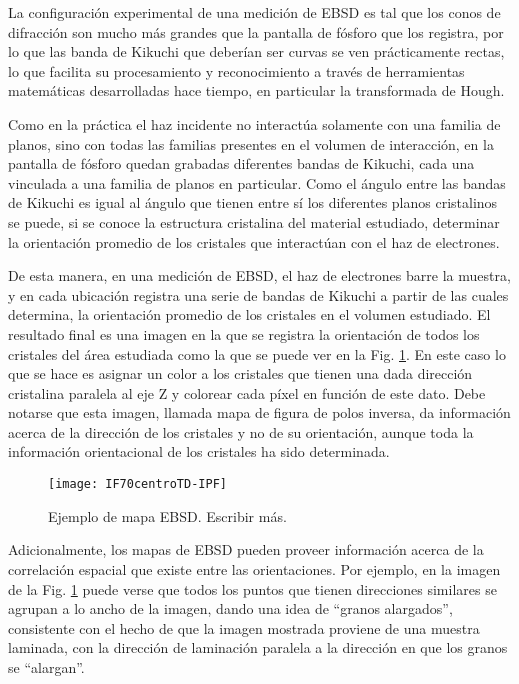 La configuración experimental de una medición de EBSD es tal que los conos de difracción son mucho más grandes que la pantalla de fósforo que los registra, por lo que las banda de Kikuchi que deberían ser curvas se ven prácticamente rectas, lo que facilita su procesamiento y reconocimiento a través de herramientas matemáticas desarrolladas hace tiempo, en particular la transformada de Hough\cite{wiki:Hough}.

Como en la práctica el haz incidente no interactúa solamente con una familia de planos, sino con todas las familias presentes en el volumen de interacción, en la pantalla de fósforo quedan grabadas diferentes bandas de Kikuchi, cada una vinculada a una familia de planos en particular.
Como el ángulo entre las bandas de Kikuchi es igual al ángulo que tienen entre sí los diferentes planos cristalinos\cite{schwartz2010electron} se puede, si se conoce la estructura cristalina del material estudiado, determinar la orientación promedio de los cristales que interactúan con el haz de electrones.

De esta manera, en una medición de EBSD, el haz de electrones barre la muestra, y en cada ubicación registra una serie de bandas de Kikuchi a partir de las cuales determina, la orientación promedio de los cristales en el volumen estudiado.
El resultado final es una imagen en la que se registra la orientación de todos los cristales del área estudiada como la que se puede ver en la Fig. \ref{fig:ebsdex}. 
En este caso lo que se hace es asignar un color a los cristales que tienen una dada dirección cristalina paralela al eje Z y colorear cada píxel en función de este dato. 
Debe notarse que esta imagen, llamada mapa de figura de polos inversa, da información acerca de la dirección de los cristales y no de su orientación, aunque toda la información orientacional de los cristales ha sido determinada.
\begin{figure}[!htb]
  \centering
  \texttt{[image: IF70centroTD-IPF]}
  \caption{Ejemplo de mapa EBSD. Escribir más.}
  \label{fig:ebsdex}
\end{figure}

Adicionalmente, los mapas de EBSD pueden proveer información acerca de la correlación espacial que existe entre las orientaciones. 
Por ejemplo, en la imagen de la Fig. \ref{fig:ebsdex} puede verse que todos los puntos que tienen direcciones similares se agrupan a lo ancho de la imagen, dando una idea de ``granos alargados'', consistente con el hecho de que la imagen mostrada proviene de una muestra laminada, con la dirección de laminación paralela a la dirección en que los granos se ``alargan''.

